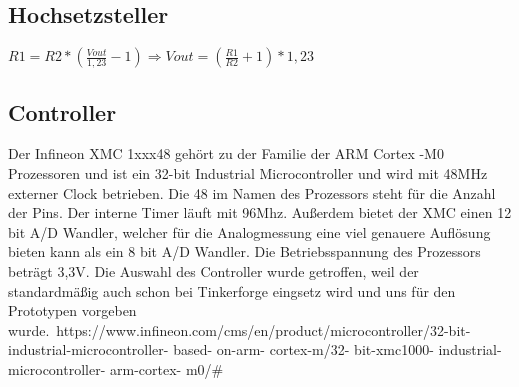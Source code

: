 \subsection{Hochsetzsteller}


\(\displaystyle R1=R2*\left(\frac{Vout}{1,23}-1\right)\Rightarrow Vout=\left(\frac{R1}{R2}+1\right)*1,23\) 


\subsection{Controller}
Der Infineon XMC 1xxx48 gehört zu der Familie der ARM Cortex -M0 Prozessoren und ist ein 32-bit Industrial Microcontroller und wird mit 48MHz externer Clock betrieben. Die 48 im Namen des Prozessors steht für die Anzahl der Pins. Der interne Timer läuft mit 96Mhz. Außerdem bietet der XMC einen 12 bit A/D Wandler, welcher für die Analogmessung eine viel genauere Auflösung bieten kann als ein 8 bit A/D Wandler. Die Betriebsspannung des Prozessors beträgt 3,3V. Die Auswahl des Controller wurde getroffen, weil der standardmäßig auch schon bei Tinkerforge eingsetz wird und uns für den Prototypen vorgeben wurde.\
https://www.infineon.com/cms/en/product/microcontroller/32-bit- industrial-microcontroller- based-
on-arm- cortex-m/32- bit-xmc1000- industrial-microcontroller- arm-cortex- m0/\#\\

